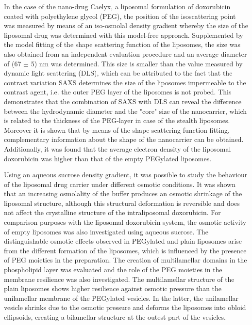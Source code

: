 In the case of the nano-drug Caelyx, a liposomal formulation of doxorubicin coated with polyethylene glycol (PEG), the position of the isoscattering point was measured by means of an iso-osmolal density gradient whereby the size of the liposomal drug was determined with this model-free approach. Supplemented by the model fitting of the shape scattering function of the liposomes, the size was also obtained from an independent evaluation procedure and an average diameter of (67 $\pm$ 5) nm was determined. This size is smaller than the value measured by dynamic light scattering (DLS), which can be attributed to the fact that the contrast variation SAXS determines the size of the liposomes impermeable to the contrast agent, i.e. the outer PEG layer of the liposomes is not probed. This demonstrates that the combination of SAXS with DLS can reveal the difference between the hydrodynamic diameter and the "core" size of the nanocarrier, which is related to the thickness of the PEG-layer in case of the stealth liposomes. Moreover it is shown that by means of the shape scattering function fitting, complementary information about the shape of the nanocarrier can be obtained. Additionally, it was found that the average electron density of the liposomal doxorubicin was higher than that of the empty PEGylated liposomes.

Using an aqueous sucrose density gradient, it was possible to study the behaviour of the liposomal drug carrier under different osmotic conditions. It was shown that an increasing osmolality of the buffer produces an osmotic shrinkage of the liposomal structure, although this structural deformation is reversible and does not affect the crystalline structure of the intraliposomal doxorubicin. For comparison purposes with the liposomal doxorubicin system, the osmotic activity of empty liposomes was also investigated using aqueous sucrose. The distinguishable osmotic effects observed in PEGylated and plain liposomes arise from the different formation of the liposomes, which is influenced by the presence of PEG moieties in the preparation. The creation of multilamellar domains in the phospholipid layer was evaluated and the role of the PEG moieties in the membrane resilience was also investigated. The multilamellar structure of the plain liposomes shows higher resilience against osmotic pressure than the unilamellar membrane of the PEGylated vesicles. In the latter, the unilamellar vesicle shrinks due to the osmotic pressure and deforms the liposomes into obloid ellipsoids, creating a bilamellar structure at the outest part of the vesicles.

